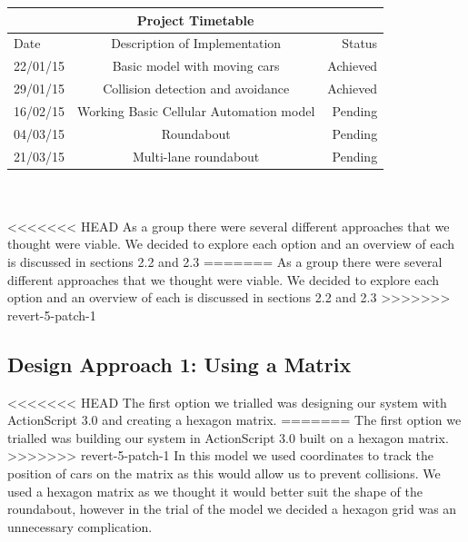 \documentclass[11pt]{article}
\begin{document}
	\begin{tabular}{ | l | c | r | }
		\hline
		\multicolumn{3}{|c|}{Project Timetable}  \\ \hline
		Date & Description of Implementation & Status \\ \hline
		22/01/15 & Basic model with moving cars &  Achieved \\ \hline
		29/01/15 & Collision detection and avoidance & Achieved \\ \hline
		16/02/15 & Working Basic Cellular Automation model & Pending \\ \hline
		04/03/15 & Roundabout & Pending \\ \hline
		21/03/15 & Multi-lane roundabout & Pending \\ \hline
		
	\end{tabular}\\\\
	
<<<<<<< HEAD
		\noindent As a group there were several different approaches that we thought were viable.
		 We decided to explore each option and an overview of each is discussed in sections 2.2 and 2.3
=======
		\noindent As a group there were several different approaches that we thought were viable. 
		We decided to explore each option and an overview of each is discussed in sections 2.2 and 2.3
>>>>>>> revert-5-patch-1
		\
	\subsection{Design Approach 1: Using a Matrix}

	
<<<<<<< HEAD
	The first option we trialled was designing our system with ActionScript 3.0 and creating a hexagon matrix. 
=======
	The first option we trialled was building our system in ActionScript 3.0 built on a hexagon matrix. 
>>>>>>> revert-5-patch-1
	In this model we used coordinates to track the position of cars on the matrix as this would allow us to prevent collisions. 
	We used a hexagon matrix as we thought it would better suit the shape of the roundabout, however in the trial of the model we decided a hexagon grid was an unnecessary complication. 
	
	
\end{document}
